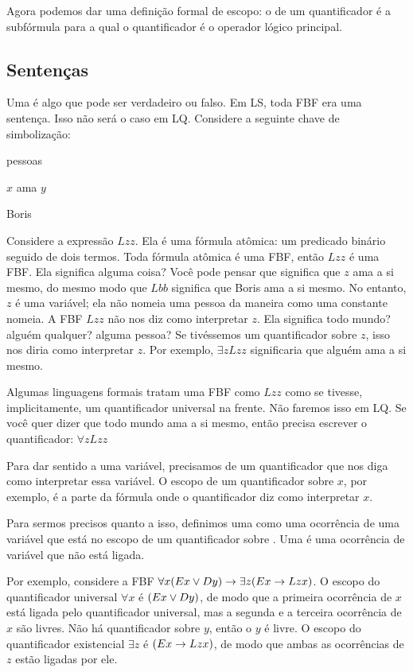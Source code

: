 Agora podemos dar uma definição formal de escopo: o  de um quantificador é a subfórmula para a qual o quantificador é o operador lógico principal. 

\subsection{Sentenças}

Uma  é algo que pode ser verdadeiro ou falso. Em LS, toda FBF era uma sentença. Isso não será o caso em LQ. Considere a seguinte chave de simbolização:
\begin{ekey}
\item[UD:] pessoas
\item[Lxy:] $x$ ama $y$
\item[b:] Boris
\end{ekey}
Considere a expressão $Lzz$. Ela é uma fórmula atômica: um predicado binário seguido de dois termos. Toda fórmula atômica é uma FBF, então $Lzz$ é uma FBF. Ela significa alguma coisa? Você pode pensar que significa que $z$ ama a si mesmo, do mesmo modo que $Lbb$ significa que Boris ama a si mesmo. No entanto, $z$ é uma variável; ela não nomeia uma pessoa da maneira como uma constante nomeia. A FBF $Lzz$ não nos diz como interpretar $z$. Ela significa todo mundo? alguém qualquer? alguma pessoa? Se tivéssemos um quantificador sobre $z$, isso nos diria como interpretar $z$. Por exemplo, $\exists zLzz$ significaria que alguém ama a si mesmo.

Algumas linguagens formais tratam uma FBF como $Lzz$ como se tivesse, implicitamente, um quantificador universal na frente. Não faremos isso em LQ. Se você quer dizer que todo mundo ama a si mesmo, então precisa escrever o quantificador: $\forall zLzz$

Para dar sentido a uma variável, precisamos de um quantificador que nos diga como interpretar essa variável. O escopo de um quantificador sobre $x$, por exemplo, é a parte da fórmula onde o quantificador diz como interpretar $x$.

Para sermos precisos quanto a isso, definimos uma  como uma ocorrência de uma variável  que está no escopo de um quantificador sobre . Uma  é uma ocorrência de variável que não está ligada.

Por exemplo, considere a FBF $\forall x(Ex \vee Dy) \rightarrow \exists z(Ex \rightarrow Lzx)$. O escopo do quantificador universal $\forall x$ é $(Ex \vee Dy)$, de modo que a primeira ocorrência de $x$ está ligada pelo quantificador universal, mas a segunda e a terceira ocorrência de $x$ são livres. Não há quantificador sobre $y$, então o $y$ é livre. O escopo do quantificador existencial $\exists z$ é $(Ex \rightarrow Lzx)$, de modo que ambas as ocorrências de $z$ estão ligadas por ele.

